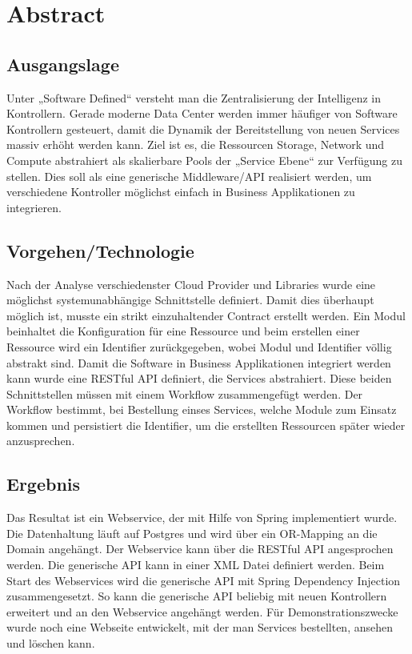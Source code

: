 \chapter*{Abstract}
\section*{Ausgangslage}
Unter „Software Defined“ versteht man die Zentralisierung der Intelligenz in Kontrollern. Gerade moderne Data Center werden immer häufiger von Software Kontrollern gesteuert, damit die Dynamik der Bereitstellung von neuen Services massiv erhöht werden kann. 
Ziel ist es, die Ressourcen Storage, Network und Compute abstrahiert als skalierbare Pools der „Service Ebene“ zur Verfügung zu stellen. Dies soll als eine generische Middleware/API realisiert werden, um verschiedene Kontroller möglichst einfach in Business Applikationen zu integrieren.

\section*{Vorgehen/Technologie}
Nach der Analyse verschiedenster Cloud Provider und Libraries wurde eine möglichst systemunabhängige Schnittstelle definiert. Damit dies überhaupt möglich ist, musste ein strikt einzuhaltender Contract erstellt werden. Ein Modul beinhaltet die Konfiguration für eine Ressource und beim erstellen einer Ressource wird ein Identifier zurückgegeben, wobei Modul und Identifier völlig abstrakt sind. Damit die Software in Business Applikationen integriert werden kann wurde eine RESTful API definiert, die Services abstrahiert. Diese beiden Schnittstellen müssen mit einem Workflow zusammengefügt werden. Der Workflow bestimmt, bei Bestellung einses Services,  welche Module zum Einsatz kommen und persistiert die Identifier, um die erstellten Ressourcen später wieder anzusprechen.

\section*{Ergebnis}
Das Resultat ist ein Webservice, der mit Hilfe von Spring implementiert wurde. Die Datenhaltung läuft auf Postgres und wird über ein OR-Mapping an die Domain angehängt. Der Webservice kann über die RESTful API angesprochen werden. Die generische API kann in einer XML Datei definiert werden. Beim Start des Webservices wird die generische API mit Spring Dependency Injection zusammengesetzt. So kann die generische API beliebig mit neuen Kontrollern erweitert und an den Webservice angehängt werden. Für Demonstrationszwecke wurde noch eine Webseite entwickelt, mit der man Services bestellten, ansehen und löschen kann.